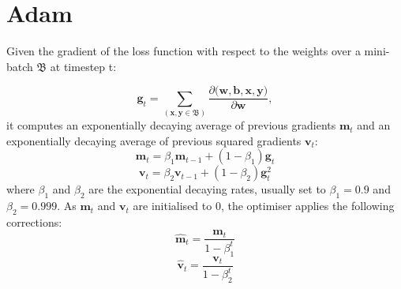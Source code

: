 \section{Adam} \label{Appendix: Adam}

Given the gradient of the loss function with respect to the weights over a mini-batch $\mathfrak{B}$ at timestep t: 

\begin{equation}
\mathbf{g}_t = 
\sum_{(\mathbf{x}, \mathbf{y} \in \mathfrak{B})}
\frac{
	\partial \mathfrak(\mathbf{w}, \mathbf{b}, \mathbf{x}, \mathbf{y})
}{
	\partial \mathbf{w}
},
\end{equation}
it computes an exponentially decaying average of previous gradients $\mathbf{m}_t$ and an exponentially decaying average of previous squared gradients $\mathbf{v}_t$:
\begin{equation}
\mathbf{m}_t = \beta_1 \mathbf{m}_{t-1} + (1-\beta_1)\mathbf{g}_t 
\end{equation}
\begin{equation}
\mathbf{v}_t = \beta_2 \mathbf{v}_{t-1} + (1-\beta_2)\mathbf{g}_t^2 
\end{equation}
where $\beta_1$ and $\beta_2$ are the exponential decaying rates, usually set to $\beta_1 = 0.9$ and $\beta_2 = 0.999$. As $\mathbf{m}_t$ and $\mathbf{v}_t$ are initialised to $0$, the optimiser applies the following corrections: 
\begin{equation}
\mathbf{\hat{m}}_t = \frac{\mathbf{m}_t}{1-\beta_1^t}
\end{equation}
\begin{equation}
\mathbf{\hat{v}}_t = \frac{\mathbf{v}_t}{1-\beta_2^t}
\end{equation}
